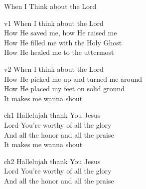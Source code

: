 \begin{song}{When I Think about the Lord}


    \begin{songframe}{v1}
        When I think about the Lord \\
        How He saved me, how He raised me \\
        How He filled me with the Holy Ghost \\
        How He healed me to the uttermost
    \end{songframe}

    \begin{songframe}{v2}
        When I think about the Lord \\
        How He picked me up and turned me around \\
        How He placed my feet on solid ground \\
        It makes me wanna shout
    \end{songframe}

    \begin{songframe}{ch1}
        Hallelujah thank You Jesus \\
        Lord You're worthy of all the glory \\
        And all the honor and all the praise \\
        It makes me wanna shout
    \end{songframe}

    \begin{songframe}{ch2}
        Hallelujah thank You Jesus \\
        Lord You're worthy of all the glory \\
        And all the honor and all the praise
    \end{songframe}


\end{song}
\endinput
